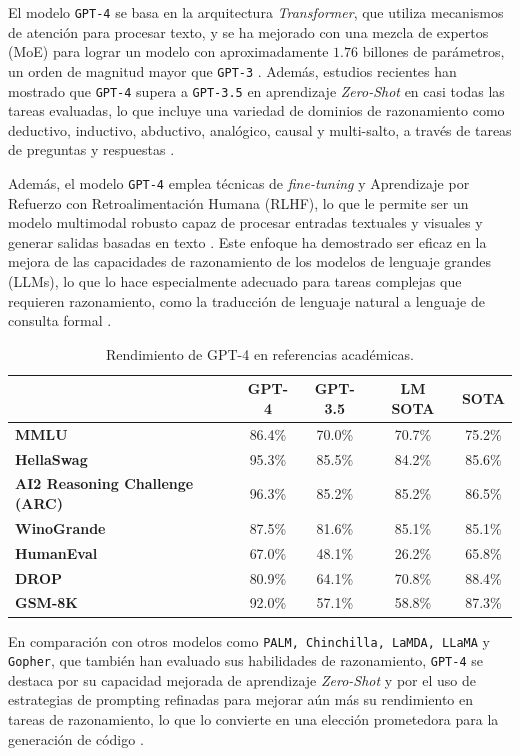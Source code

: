 El modelo  \texttt{GPT-4} se basa en la arquitectura \textit{Transformer}, que utiliza mecanismos de atención para procesar texto, y se ha mejorado con una mezcla de expertos (MoE) para lograr un modelo con aproximadamente $1.76$ billones de parámetros, un orden de magnitud mayor que  \texttt{GPT-3} \cite{gpt4}. Además, estudios recientes han mostrado que \texttt{GPT-4} supera a  \texttt{GPT-3.5} en aprendizaje \textit{Zero-Shot} en casi todas las tareas evaluadas, lo que incluye una variedad de dominios de razonamiento como deductivo, inductivo, abductivo, analógico, causal y multi-salto, a través de tareas de preguntas y respuestas \cite{gpt4}.

Además, el modelo  \texttt{GPT-4} emplea técnicas de \textit{fine-tuning} y Aprendizaje por Refuerzo con Retroalimentación Humana (RLHF), lo que le permite ser un modelo multimodal robusto capaz de procesar entradas textuales y visuales y generar salidas basadas en texto \cite{gpt4}. Este enfoque ha demostrado ser eficaz en la mejora de las capacidades de razonamiento de los modelos de lenguaje grandes (LLMs), lo que lo hace especialmente adecuado para tareas complejas que requieren razonamiento, como la traducción de lenguaje natural a lenguaje de consulta formal \cite{gpt4all}.

\begin{table}[H]
  \centering
  \caption{Rendimiento de GPT-4 en referencias académicas. \cite{gpt4}}
  \begin{tabularx}{\textwidth}{Xcccc}
    \toprule
    & \textbf{GPT-4} & \textbf{GPT-3.5} & \textbf{LM SOTA} & \textbf{SOTA} \\
    \midrule
    \textbf{MMLU} & 86.4\% & 70.0\% & 70.7\% & 75.2\% \\
    \textbf{HellaSwag} & 95.3\% & 85.5\% & 84.2\% & 85.6\% \\
    \textbf{AI2 Reasoning Challenge (ARC)} & 96.3\% & 85.2\% & 85.2\% & 86.5\% \\
    \textbf{WinoGrande} & 87.5\% & 81.6\% & 85.1\% & 85.1\% \\
    \textbf{HumanEval} & 67.0\% & 48.1\% & 26.2\% & 65.8\% \\
    \textbf{DROP} & 80.9\% & 64.1\% & 70.8\% & 88.4\% \\
    \textbf{GSM-8K} & 92.0\% & 57.1\% & 58.8\% & 87.3\% \\
    \bottomrule
  \end{tabularx}
  \label{tab:my_label}
\end{table}

En comparación con otros modelos como \texttt{PALM, Chinchilla, LaMDA, LLaMA} y \texttt{Gopher}, que también han evaluado sus habilidades de razonamiento,  \texttt{GPT-4} se destaca por su capacidad mejorada de aprendizaje \textit{Zero-Shot} y por el uso de estrategias de prompting refinadas para mejorar aún más su rendimiento en tareas de razonamiento, lo que lo convierte en una elección prometedora para la generación de código \cite{gpt4}.

